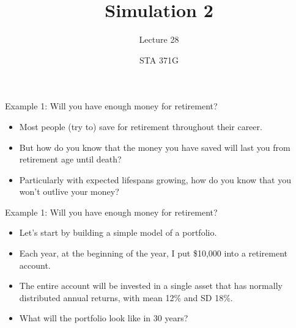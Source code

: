 \documentclass{beamer}\usepackage[]{graphicx}\usepackage[]{color}
\title{Simulation 2}
\subtitle{Lecture 28}
\author{STA 371G}
\begin{document}
  
  

  \frame{\maketitle}



  \begin{darkframes}
    \begin{frame}{Example 1: Will you have enough money for retirement?}
      \begin{itemize}[<+->]
        \item Most people (try to) save for retirement throughout their career.
        \item But how do you know that the money you have saved will last you from retirement age until death?
        \item Particularly with expected lifespans growing, how do you know that you won't outlive your money?
      \end{itemize}
    \end{frame}

    \begin{frame}{Example 1: Will you have enough money for retirement?}
      \begin{itemize}[<+->]
        \item Let's start by building a simple model of a portfolio.
        \item Each year, at the beginning of the year, I put \$10,000 into a retirement account.
        \item The entire account will be invested in a single asset that has normally distributed annual returns, with mean 12\% and SD 18\%.
        \item What will the portfolio look like in 30 years?
      \end{itemize}
    \end{frame}


\end{darkframes}
\end{document}
